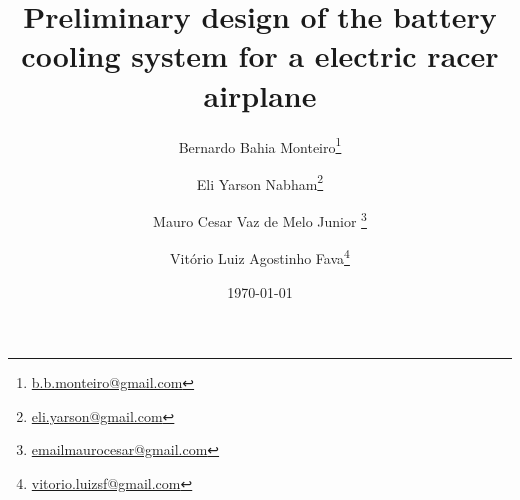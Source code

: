 \documentclass{article}
\title{Preliminary design of the battery cooling system for a electric racer airplane}
\author{Bernardo Bahia Monteiro\thanks{\url{b.b.monteiro@gmail.com}} \and
        Eli Yarson Nabham\thanks{\url{eli.yarson@gmail.com}} \and
        Mauro Cesar Vaz de Melo Junior \thanks{\url{emailmaurocesar@gmail.com}}\and
        Vitório Luiz Agostinho Fava\thanks{\url{vitorio.luizsf@gmail.com}}
        }
\date{\today}
\begin{document}
\maketitle











\nocite{*}
%


\end{document}
